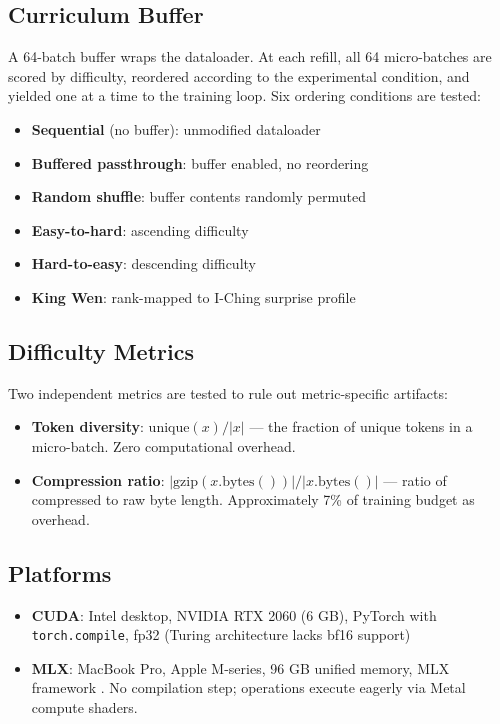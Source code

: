 \documentclass{article}
\begin{document}
\subsection{Curriculum Buffer}

A 64-batch buffer wraps the dataloader. At each refill, all 64
micro-batches are scored by difficulty, reordered according to the
experimental condition, and yielded one at a time to the training loop.
Six ordering conditions are tested:

\begin{itemize}\tightlist
\item \textbf{Sequential} (no buffer): unmodified dataloader
\item \textbf{Buffered passthrough}: buffer enabled, no reordering
\item \textbf{Random shuffle}: buffer contents randomly permuted
\item \textbf{Easy-to-hard}: ascending difficulty
\item \textbf{Hard-to-easy}: descending difficulty
\item \textbf{King Wen}: rank-mapped to I-Ching surprise profile
\end{itemize}

\subsection{Difficulty Metrics}

Two independent metrics are tested to rule out metric-specific artifacts:

\begin{itemize}\tightlist
\item \textbf{Token diversity}: $\text{unique}(x) / |x|$ --- the fraction
of unique tokens in a micro-batch. Zero computational overhead.
\item \textbf{Compression ratio}: $|\text{gzip}(x.\text{bytes}())| / |x.\text{bytes}()|$
--- ratio of compressed to raw byte length. Approximately 7\% of
training budget as overhead.
\end{itemize}

\subsection{Platforms}

\begin{itemize}\tightlist
\item \textbf{CUDA}: Intel desktop, NVIDIA RTX 2060 (6 GB), PyTorch with
\texttt{torch.compile}, fp32 (Turing architecture lacks bf16 support)
\item \textbf{MLX}: MacBook Pro, Apple M-series, 96 GB unified memory,
MLX framework \cite{mlx2023}. No compilation step; operations execute
eagerly via Metal compute shaders.
\end{itemize}
\end{document}
